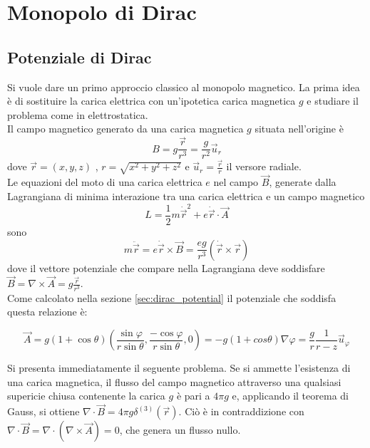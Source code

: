 \chapter{Monopolo di Dirac}\label{cap:diracmonopole}
\section{Potenziale di Dirac}
Si vuole dare un primo approccio classico al monopolo magnetico.
La prima idea è di sostituire la carica elettrica con un'ipotetica carica magnetica
$g$ e studiare il problema come in elettrostatica.\\
Il campo magnetico generato da una carica magnetica $g$ situata nell'origine è
%
\begin{equation}\label{eq:monopolefield}
   B = g \frac{\vec r}{r^3} = \frac{g}{r^2} \vec u _r
\end{equation}
%
dove $\vec r = (x,y,z)$ , $r = \sqrt{x^2 + y^2 + z^2}$ e $\vec u _r = \frac{\vec r}{r}$
il versore radiale.\\
Le equazioni del moto di una carica elettrica $e$ nel campo $\vec B$,
generate dalla Lagrangiana di minima interazione tra una carica elettrica e un campo
magnetico
%
$$
   L = \frac{1}{2} m \dot{\vec r} ^2 + e \dot{\vec r} \cdot \vec A
$$
%
sono
%
$$
   m \ddot{\vec r} = e\dot{\vec r} \times \vec B =
      \frac{eg}{r^3}(\dot{\vec r} \times \vec r)
$$
%
dove il vettore potenziale che compare nella Lagrangiana deve soddisfare
$\vec B = \nabla \times \vec A = g \frac{\vec r}{r^3}$.\\

Come calcolato nella sezione \ref{sec:dirac_potential} il potenziale che soddisfa
questa relazione è:

\begin{equation}\label{eq:diracpotential}
  \vec A = g(1 + \cos\theta)\left( \frac{\sin\varphi}{r\sin\theta},
     \frac{-\cos\varphi}{r\sin\theta},0 \right) = - g (1+cos\theta) \nabla \varphi
     = \frac{g}{r}\frac{1}{r-z} \vec u _\varphi
\end{equation}

Si presenta immediatamente il seguente problema. Se si ammette l'esistenza di una carica
magnetica, il flusso del campo magnetico attraverso una qualsiasi supericie chiusa
contenente la carica $g$ è pari a $4\pi g$ e, applicando il teorema di Gauss,
si ottiene $\nabla \cdot \vec B = 4\pi g\delta^{(3)}(\vec r)$.
Ciò è in contraddizione con $\nabla \cdot \vec B = \nabla \cdot
(\nabla \times \vec A) = 0$, che genera un flusso nullo.

